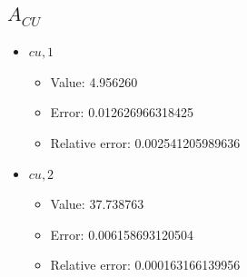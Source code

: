 \documentclass{article}%
\begin{document}
\subsection{$A_{CU}$}%
\begin{itemize}%
	\item $\textit{cu},1$%
	\begin{itemize}%
		\item Value: 4.956260%
		\item Error: 0.012626966318425%
		\item Relative error: 0.002541205989636%
	\end{itemize}%
	\item $\textit{cu},2$%
	\begin{itemize}%
		\item Value: 37.738763%
		\item Error: 0.006158693120504%
		\item Relative error: 0.000163166139956%
	\end{itemize}%
\end{itemize}%
\end{document}
